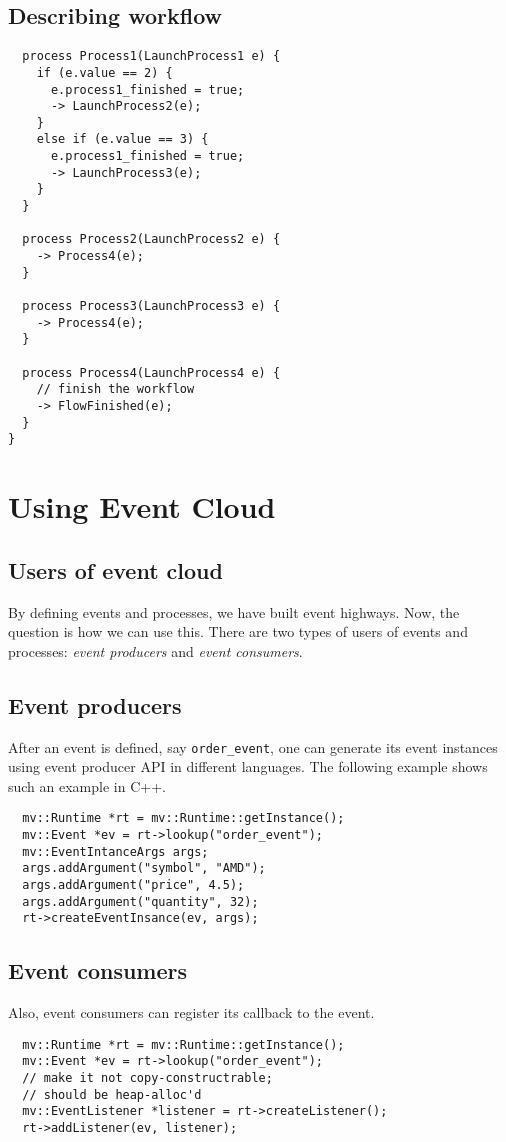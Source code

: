 \documentclass{pamsbook}
\begin{document}
\subsection{Describing workflow}
{\small
\begin{verbatim}
  process Process1(LaunchProcess1 e) {
    if (e.value == 2) {
      e.process1_finished = true;
      -> LaunchProcess2(e);
    }
    else if (e.value == 3) {
      e.process1_finished = true;
      -> LaunchProcess3(e);
    }
  }

  process Process2(LaunchProcess2 e) {
    -> Process4(e);
  }

  process Process3(LaunchProcess3 e) {
    -> Process4(e);
  }

  process Process4(LaunchProcess4 e) {
    // finish the workflow
    -> FlowFinished(e);
  }
}
\end{verbatim}




\section{Using Event Cloud}

\subsection{Users of event cloud}
By defining events and processes, we have built event highways. Now, the
question is how we can use this. There are two types of users of events and
processes: {\em event producers} and {\em event consumers}. 

\subsection{Event producers}
After an event is defined, say \verb+order_event+, one can generate its event
instances using event producer API in different languages. The following
example shows such an example in C++. 

{\small
\begin{verbatim}
  mv::Runtime *rt = mv::Runtime::getInstance();
  mv::Event *ev = rt->lookup("order_event");
  mv::EventIntanceArgs args;
  args.addArgument("symbol", "AMD");
  args.addArgument("price", 4.5);
  args.addArgument("quantity", 32);
  rt->createEventInsance(ev, args);
\end{verbatim}
}


\subsection{Event consumers}
Also, event consumers can register its callback to the event.
{\small
\begin{verbatim}
  mv::Runtime *rt = mv::Runtime::getInstance();
  mv::Event *ev = rt->lookup("order_event");
  // make it not copy-constructrable;
  // should be heap-alloc'd
  mv::EventListener *listener = rt->createListener();
  rt->addListener(ev, listener);
\end{verbatim}
}


}
\end{document}
